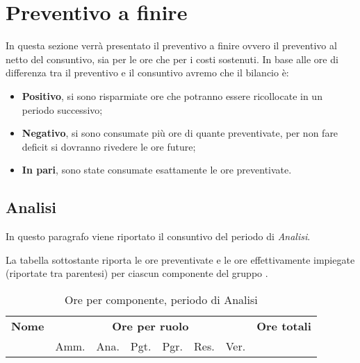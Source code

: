 %

\section{Preventivo a finire}
\label{consuntivo}

In questa sezione verrà presentato il preventivo a finire ovvero il preventivo al netto del consuntivo, sia per le ore che per i costi sostenuti. In base alle ore di differenza tra il preventivo e il consuntivo avremo che il bilancio è:
\begin{itemize}
\item \textbf{Positivo}, si sono risparmiate ore che potranno essere ricollocate in un periodo successivo;
\item \textbf{Negativo}, si sono consumate più ore di quante preventivate, per non fare deficit si dovranno rivedere le ore future;
\item \textbf{In pari}, sono state consumate esattamente le ore preventivate.
\end{itemize}

\subsection{Analisi}

In questo paragrafo viene riportato il consuntivo del periodo di \textit{Analisi}.

La tabella sottostante riporta le ore preventivate e le ore effettivamente impiegate (riportate tra parentesi) per ciascun componente del gruppo \GroupName{}.

\begin{table}[H]
\begin{tabular}{lccccccc}
\toprule
    \textbf{Nome}  & \multicolumn{6}{c}{\textbf{Ore per ruolo}} & \textbf{Ore totali} \\
     & Amm. & Ana. & Pgt. & Pgr. & Res. & Ver. & \\
    \midrule
    
    	
    
    \bottomrule
\end{tabular}
\caption{Ore per componente, periodo di Analisi}
\end{table}

